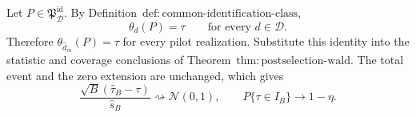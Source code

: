 Let \(P\in\mathfrak P_{\mathcal D}^{\mathrm{id}}\).  By Definition~\(\mathrm{def{:}common\text{-}identification\text{-}class}\),
\[
 \theta_d(P)=\tau
 \qquad\text{for every }d\in\mathcal D.
\]
Therefore \(\theta_{\widehat d_m}(P)=\tau\) for every pilot realization.  Substitute this identity into the statistic and coverage conclusions of Theorem~\(\mathrm{thm{:}postselection\text{-}wald}\).  The total event and the zero extension are unchanged, which gives
\[
 \frac{\sqrt B(\widehat\tau_B-\tau)}{\widehat s_B}
 \rightsquigarrow\mathcal N(0,1),
 \qquad
 P\{\tau\in I_B\}\longrightarrow1-\eta.
\]